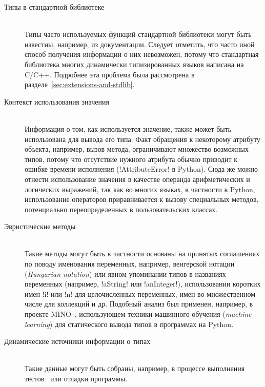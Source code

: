 \begin{description}
    \item[Типы в стандартной библиотеке] \hfill \\
        Типы часто используемых функций стандартной библиотеки могут быть
        известны, например, из документации. Следует отметить, что часто иной
        способ получения информации о них невозможен, потому что стандартная
        библиотека многих динамически типизированных языков написана на C/C++.
        Подробнее эта проблема была рассмотрена в
        разделе~\ref{sec:extensions-and-stdlib}.

    \item[Контекст использования значения] \hfill \\
        Информация о том, как используется значение, также может быть
        использована для вывода его типа. Факт обращения к некоторому атрибуту
        объекта, например, вызов метода, ограничивают множество возможных
        типов, потому что отсутствие нужного атрибута обычно приводит к ошибке
        времени исполнения (!AttributeError! в Python).  Сюда же можно отнести
        использование значения в качестве операнда арифметических и логических
        выражений, так как во многих языках, в частности в Python, использование
        операторов приравнивается к вызову специальных методов, потенциально
        переопределенных в пользовательских классах.

    \item[Эвристические методы] \hfill \\
        Такие методы могут быть в частности основаны на принятых соглашениях по
        поводу именования переменных, например, венгерской нотации
        (\emph{Hungarian notation}) или явном упоминании типов в названиях
        переменных (например, !aString! или !anInteger!),
        использовании коротких имен !i! или !n!  для целочисленных переменных,
        имен во множественном числе для коллекций и др. Подобный анализ был
        применен, например, в проекте MINO~\cite[]{Tu}, использующем техники
        машинного обучения (\emph{machine learning}) для статического вывода
        типов в программах на Python.

    \item[Динамические источники информации о типах] \hfill \\
        Такие данные могут быть собраны, например, в процессе выполнения
        тестов~\cite{Haupt2011} или отладки программы.


\end{description}
